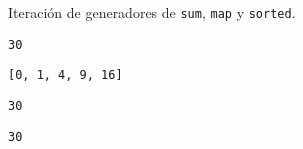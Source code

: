 \begin{code} Iteración de generadores de \texttt{sum}, \texttt{map} y
\texttt{sorted}.

\begin{Shaded}
\begin{Highlighting}[]
\OperatorTok{**}  \NormalTok{(}\NormalTok{))}
\end{Highlighting}
\end{Shaded}

\begin{verbatim}
30
\end{verbatim}

\begin{Shaded}
\begin{Highlighting}[]
\OperatorTok{**}  \NormalTok{(}\NormalTok{))}
\end{Highlighting}
\end{Shaded}

\begin{verbatim}
[0, 1, 4, 9, 16]
\end{verbatim}

\begin{Shaded}
\begin{Highlighting}[]
\NormalTok{(}\NormalTok{(}\OperatorTok{**}\NormalTok{, }\NormalTok{(}\NormalTok{)))}
\end{Highlighting}
\end{Shaded}

\begin{verbatim}
30
\end{verbatim}

\begin{Shaded}
\begin{Highlighting}[]
 

\NormalTok{(}\OperatorTok{+}\OperatorTok{**}\NormalTok{, }\NormalTok{(}\NormalTok{))}
\end{Highlighting}
\end{Shaded}

\begin{verbatim}
30
\end{verbatim}
\end{code}

